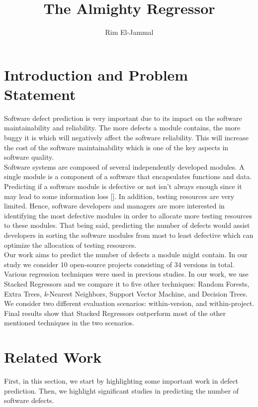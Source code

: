 \documentclass[]{article}
\title{The Almighty Regressor}
\author{Rim El-Jammal}
\begin{document}
	
	\maketitle 
	
	\section{Introduction and Problem Statement}
	
	Software defect prediction is very important due to its impact on the software maintainability and reliability. The more defects a module contains, the more buggy it is which will negatively affect the software reliability. This will increase the cost of the software maintainability which is one of the key aspects in software quality. \\
	Software systems are composed of several independently developed modules. A single module is a component of a software that encapsulates functions and data. Predicting if a software module is defective or not isn't always enough since it may lead to some information loss []. In addition, testing resources are very limited. Hence, software developers and managers are more interested in identifying the most defective modules in order to allocate more testing resources to these modules. That being said, predicting the number of defects would assist developers in sorting the software modules from most to least defective which can optimize the allocation of testing resources. \\
	Our work aims to predict the number of defects a module might contain. In our study we consider 10 open-source projects consisting of 34 versions in total. Various regression techniques were used in previous studies. In our work, we use Stacked Regressors and we compare it to five other techniques: Random Forests, Extra Trees, \textit{k}-Nearest Neighbors, Support Vector Machine, and Decision Trees. We consider two different evaluation scenarios: within-version, and within-project. Final results show that Stacked Regressors outperform most of the other mentioned techniques in the two scenarios. 
	
	
	\section{Related Work}
	First, in this section, we start by highlighting some important work in defect prediction. Then, we highlight significant studies in predicting the number of software defects.
\end{document}
